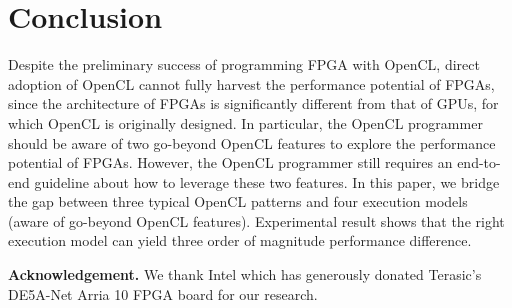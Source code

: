 \section{Conclusion}
Despite the preliminary success of programming FPGA with OpenCL, direct adoption of OpenCL cannot fully harvest the performance potential of FPGAs, since the architecture of FPGAs is significantly different from that of GPUs, for which OpenCL is originally designed. In particular, the OpenCL programmer should be aware of two go-beyond OpenCL features to explore the performance potential of FPGAs. However, the OpenCL programmer still requires an end-to-end guideline about how to leverage these two features. In this paper, we bridge the gap between three typical OpenCL patterns and four execution models (aware of go-beyond OpenCL features). Experimental result shows that the right execution model can yield three order of magnitude performance difference. 

\noindent
{\bf Acknowledgement. }We thank Intel which has generously donated Terasic\textquoteright s DE5A-Net Arria 10 FPGA board for our research.   








